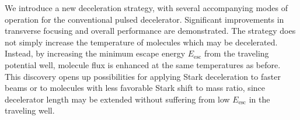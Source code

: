 \documentclass[%
 reprint,
 amsmath,amssymb,
 aps,
prl,
]{revtex4-1}
\begin{document}



We introduce a new deceleration strategy, with several accompanying modes of operation for the conventional pulsed decelerator. 
Significant improvements in transverse focusing and overall performance are demonstrated.
The strategy does not simply increase the temperature of molecules which may be decelerated.
Instead, by increasing the minimum escape energy $E_\text{esc}$ from the traveling potential well, molecule flux is enhanced at the same temperatures as before.
This discovery opens up possibilities for applying Stark deceleration to faster beams or to molecules with less favorable Stark shift to mass ratio, since decelerator length may be extended without suffering from low $E_\text{esc}$ in the traveling well.
\end{document}
